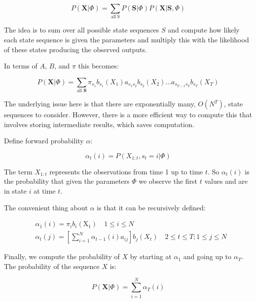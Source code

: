 \begin{equation}
   P(\mathbf{X} | \Phi)=\sum_{\mathrm{all\:S}} P(\mathbf{S} | \Phi) P(\mathbf{X} | \mathbf{S}, \Phi) 
\end{equation}

The idea is to sum over all possible state sequences $S$ and compute how likely each state sequence is given the parameters and multiply this with the likelihood of these states producing the observed outputs. 

In terms of $A$, $B$, and $\pi$ this becomes:

\begin{equation}
   P(\mathbf{X} | \Phi)=\sum_{\text {all } \mathbf{S}} \pi_{s_{1}} b_{s_{1}}\left(X_{1}\right) a_{s_{1} s_{2}} b_{s_{2}}\left(X_{2}\right) \ldots a_{s_{T-1} s_{T}} b_{s_{T}}\left(X_{T}\right) 
\end{equation}

The underlying issue here is that there are exponentially many, $O(N^{T})$, state sequences to consider. However, there is a more efficient way to compute this that involves storing intermediate results, which saves computation. 

Define forward probability $\alpha$:

\begin{equation}
   \alpha_{t}(i)=P\left(X_{1:t}, s_{t}=i | \Phi\right) 
\end{equation}

The term $X_{1:t}$ represents the observations from time 1 up to time $t$. So $\alpha_{t}(i)$ is the probability that given the parameters $\Phi$ we observe the first $t$ values and are in state $i$ at time $t$.

The convenient thing about $\alpha$ is that it can be recursively defined:

\begin{equation}
\begin{aligned}
&\alpha_{1}(i)=\pi_{i} b_{i}\left(\mathrm{X}_{1}\right) \quad 1 \leq i \leq N \\
&\alpha_{t}(j)=\left[\sum_{i=1}^{N} \alpha_{t-1}(i) a_{i j}\right] b_{j}\left(X_{t}\right) \quad 2 \leq t \leq T ; 1 \leq j \leq N
\end{aligned}
\label{eq:alpha-def}
\end{equation}

Finally, we compute the probability of $X$ by starting at $\alpha_1$ and going up to $\alpha_T$. The probability of the sequence $X$ is:

\begin{equation}
   P(\mathbf{X} | \Phi)=\sum_{i=1}^{N} \alpha_{T}(i) 
  \label{eq:prop-statement}
\end{equation}

